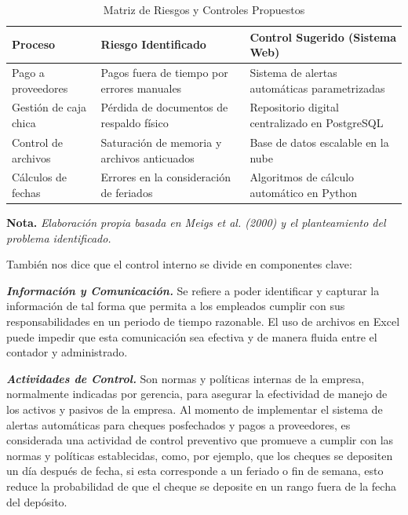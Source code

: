 \begin{table}[h]
    \centering
    \caption{Matriz de Riesgos y Controles Propuestos}
    \vspace{0.2cm}
    \begin{tabular}{p{3cm} p{5cm} p{5cm}}
        \toprule
        \textbf{Proceso} & \textbf{Riesgo Identificado} & \textbf{Control Sugerido (Sistema Web)} \\
        \midrule
        Pago a proveedores & Pagos fuera de tiempo por errores manuales & Sistema de alertas automáticas parametrizadas \\
        Gestión de caja chica & Pérdida de documentos de respaldo físico & Repositorio digital centralizado en PostgreSQL \\
        Control de archivos & Saturación de memoria y archivos anticuados & Base de datos escalable en la nube \\
        Cálculos de fechas & Errores en la consideración de feriados & Algoritmos de cálculo automático en Python \\
        \bottomrule
    \end{tabular}
    
    \vspace{0.2cm}
    \raggedright \small \textbf{Nota.} \textit{Elaboración propia basada en Meigs et al. (2000) y el planteamiento del problema identificado.}
\end{table}

También nos dice que el control interno se divide en componentes clave:

\textbf{\textit{Información y Comunicación.}} Se refiere a poder identificar y capturar la información de tal forma que permita a los empleados cumplir con sus responsabilidades en un periodo de tiempo razonable. El uso de archivos en Excel puede impedir que esta comunicación sea efectiva y de manera fluida entre el contador y administrado.

\textbf{\textit{Actividades de Control.}} Son normas y políticas internas de la empresa, normalmente indicadas por gerencia, para asegurar la efectividad de manejo de los activos y pasivos de la empresa. Al momento de implementar el sistema de alertas automáticas para cheques posfechados y pagos a proveedores, es considerada una actividad de control preventivo que promueve a cumplir con las normas y políticas establecidas, como, por ejemplo, que los cheques se depositen un día después de fecha, si esta corresponde a un feriado o fin de semana, esto reduce la probabilidad de que el cheque se deposite en un rango fuera de la fecha del depósito.

